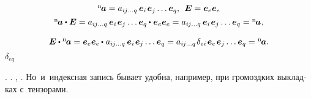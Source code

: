 \begin{otherlanguage}{russian}
\nopagebreak\vspace{-0.1em}\[\begin{array}{c}
{^\mathrm{n}\hspace{-0.2ex}\bm{a}} = a_{i\hspace{-0.1ex}j \ldots q} \hspace{.4ex} \bm{e}_i \hspace{.2ex} \bm{e}_j \ldots \bm{e}_q , \;\,  \bm{E} = \bm{e}_e \bm{e}_e
\\[.4em]
%
{^\mathrm{n}\hspace{-0.2ex}\bm{a}} \dotp \bm{E} = a_{i\hspace{-0.1ex}j \ldots q} \hspace{.4ex} \bm{e}_i \hspace{.2ex} \bm{e}_j \ldots \tikzmark{BeginDeltaEQBrace} {\bm{e}_q \hspace{-0.1ex} \dotp \hspace{.1ex} \bm{e}_e} \tikzmark{EndDeltaEQBrace} \bm{e}_e = a_{i\hspace{-0.1ex}j \ldots q} \hspace{.4ex} \bm{e}_i \hspace{.2ex} \bm{e}_j \ldots \bm{e}_q = {^\mathrm{n}\hspace{-0.2ex}\bm{a}} \hspace{.1ex},
\\[1.1em]
%
\bm{E} \dotp {^\mathrm{n}\hspace{-0.2ex}\bm{a}} = \bm{e}_e \bm{e}_e \hspace{-0.1ex} \dotp \hspace{.1ex}  a_{i\hspace{-0.1ex}j \ldots q} \hspace{.4ex} \bm{e}_i \hspace{.2ex} \bm{e}_j \ldots \bm{e}_q = a_{i\hspace{-0.1ex}j \ldots q} \hspace{.2ex} \delta_{ei} \hspace{.2ex} \bm{e}_e \hspace{.2ex} \bm{e}_j \ldots \bm{e}_q = {^\mathrm{n}\hspace{-0.2ex}\bm{a}}.
\end{array}\]
%
{${\scriptstyle \delta_{eq}}$}

\vspace{-0.5em}    .
  .
 ,    .
Но~и~индексная запись бывает удобна, например, при громоздких выкладках с~тензорами.

\end{otherlanguage}

